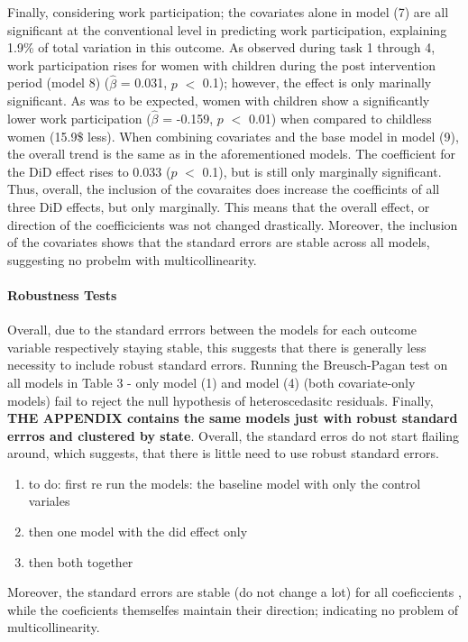 \documentclass[a4paper]{article}
\begin{document}
\indent Finally, considering work participation; the covariates alone in model (7) are all significant at the conventional level in predicting work participation, explaining 1.9\% of total variation in this outcome. As observed during task 1 through 4, work participation rises for women with children during the post intervention period (model 8) ($\hat{\beta}$ = 0.031, $p$ $<$ 0.1); however, the effect is only marinally significant. As was to be expected, women with children show a significantly lower work participation ($\hat{\beta}$ = -0.159, $p$ $<$ 0.01) when compared to childless women (15.9\$ less). When combining covariates and the base model in model (9), the overall trend is the same as in the aforementioned models. The coefficient for the DiD effect rises to 0.033 ($p$ $<$ 0.1), but is still only marginally significant.
Thus, overall, the inclusion of the covaraites does increase the coefficints of all three DiD effects, but only marginally. This means that the overall effect, or direction of the coefficicients was not changed drastically. Moreover, the inclusion of the covariates shows that the standard errors are stable across all models, suggesting no probelm with multicollinearity. 
\paragraph{Robustness Tests} Overall, due to the standard errrors between the models for each outcome variable respectively staying stable, this suggests that there is generally less necessity to include robust standard errors. Running the Breusch-Pagan test on all models in Table 3 - only model (1) and model (4) (both covariate-only models) fail to reject the null hypothesis of heteroscedasitc residuals. Finally, \textbf{THE APPENDIX contains the same models just with robust standard errros and clustered by state}. Overall, the standard erros do not start flailing around, which suggests, that there is little need to use robust standard errors. 




\begin{enumerate}
   \item to do: first re run the models: the baseline model with only the control variales
   \item then one model with the did effect only 
   \item then both together 
\end{enumerate}

Moreover, the standard errors are stable (do not change a lot) for all coeficcients , while the coeficients themselfes maintain their direction; indicating no problem of multicollinearity. 
\end{document}
